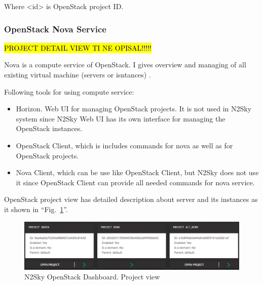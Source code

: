 Where <id> is OpenStack project ID.

\subsubsection{OpenStack Nova Service}\label{OpenStack Nova Service}

\hl{PROJECT DETAIL VIEW TI NE OPISAL!!!!!}

Nova is a compute service of OpenStack. I gives overview and managing of all existing virtual machine (servers or isntances) \cite{Markelov2016}. 

Following tools for using compute service:
\begin{itemize}
\item Horizon. Web UI for managing OpenStack projects. It is not used in N2Sky system since N2Sky Web UI has its own interface for managing the OpenStack instances.
\item OpenStack Client, which is includes commands for nova as well as for OpenStack projects.
\item Nova Client, which can be use like OpenStack Client, but N2Sky does not use it since OpenStack Client can provide all needed commands for nova service. 
\end{itemize}


OpenStack project view has detailed description about server and its instances as it shown in ``Fig.~\ref{fig:openstack_dashboard_projects}''. 

\begin{figure}[htbp]
\begin{center}
  \includegraphics[width=\linewidth]{components/4/pics/openstack_dashboard_projects.png}
  \caption{N2Sky OpenStack Dashboard. Project view}
  \label{fig:openstack_dashboard_projects}
\end{center}
\end{figure}

